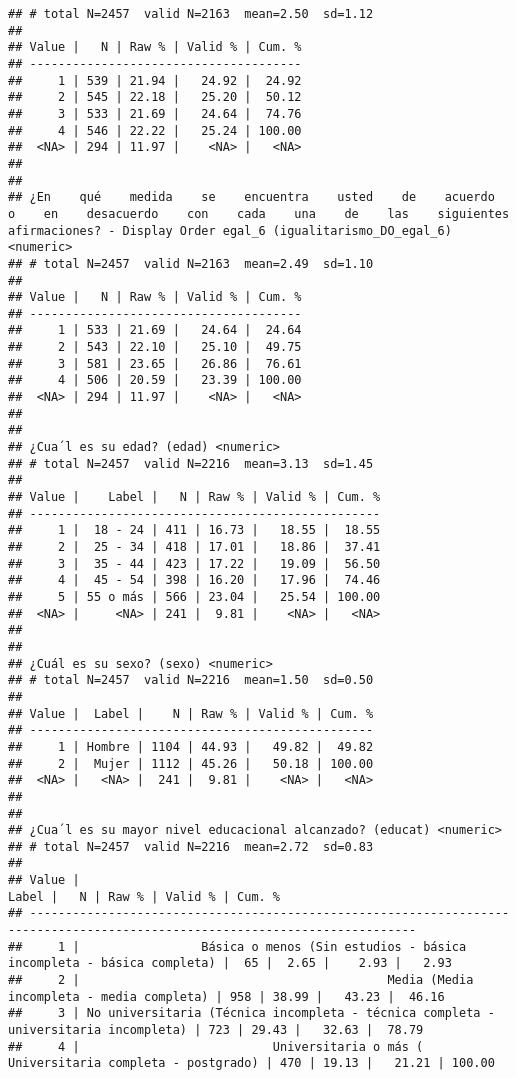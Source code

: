 \documentclass[
  10,
  landscape,
  legalpaper]{article}
\begin{document}
\begin{verbatim}
## # total N=2457  valid N=2163  mean=2.50  sd=1.12
## 
## Value |   N | Raw % | Valid % | Cum. %
## --------------------------------------
##     1 | 539 | 21.94 |   24.92 |  24.92
##     2 | 545 | 22.18 |   25.20 |  50.12
##     3 | 533 | 21.69 |   24.64 |  74.76
##     4 | 546 | 22.22 |   25.24 | 100.00
##  <NA> | 294 | 11.97 |    <NA> |   <NA>
## 
## 
## ¿En    qué    medida    se    encuentra    usted    de    acuerdo    o    en    desacuerdo    con    cada    una    de    las    siguientes    afirmaciones? - Display Order egal_6 (igualitarismo_DO_egal_6) <numeric>
## # total N=2457  valid N=2163  mean=2.49  sd=1.10
## 
## Value |   N | Raw % | Valid % | Cum. %
## --------------------------------------
##     1 | 533 | 21.69 |   24.64 |  24.64
##     2 | 543 | 22.10 |   25.10 |  49.75
##     3 | 581 | 23.65 |   26.86 |  76.61
##     4 | 506 | 20.59 |   23.39 | 100.00
##  <NA> | 294 | 11.97 |    <NA> |   <NA>
## 
## 
## ¿Cua´l es su edad? (edad) <numeric>
## # total N=2457  valid N=2216  mean=3.13  sd=1.45
## 
## Value |    Label |   N | Raw % | Valid % | Cum. %
## -------------------------------------------------
##     1 |  18 - 24 | 411 | 16.73 |   18.55 |  18.55
##     2 |  25 - 34 | 418 | 17.01 |   18.86 |  37.41
##     3 |  35 - 44 | 423 | 17.22 |   19.09 |  56.50
##     4 |  45 - 54 | 398 | 16.20 |   17.96 |  74.46
##     5 | 55 o más | 566 | 23.04 |   25.54 | 100.00
##  <NA> |     <NA> | 241 |  9.81 |    <NA> |   <NA>
## 
## 
## ¿Cuál es su sexo? (sexo) <numeric>
## # total N=2457  valid N=2216  mean=1.50  sd=0.50
## 
## Value |  Label |    N | Raw % | Valid % | Cum. %
## ------------------------------------------------
##     1 | Hombre | 1104 | 44.93 |   49.82 |  49.82
##     2 |  Mujer | 1112 | 45.26 |   50.18 | 100.00
##  <NA> |   <NA> |  241 |  9.81 |    <NA> |   <NA>
## 
## 
## ¿Cua´l es su mayor nivel educacional alcanzado? (educat) <numeric>
## # total N=2457  valid N=2216  mean=2.72  sd=0.83
## 
## Value |                                                                               Label |   N | Raw % | Valid % | Cum. %
## ----------------------------------------------------------------------------------------------------------------------------
##     1 |                 Básica o menos (Sin estudios - básica incompleta - básica completa) |  65 |  2.65 |    2.93 |   2.93
##     2 |                                           Media (Media incompleta - media completa) | 958 | 38.99 |   43.23 |  46.16
##     3 | No universitaria (Técnica incompleta - técnica completa - universitaria incompleta) | 723 | 29.43 |   32.63 |  78.79
##     4 |                           Universitaria o más ( Universitaria completa - postgrado) | 470 | 19.13 |   21.21 | 100.00

\end{verbatim}
\end{document}

